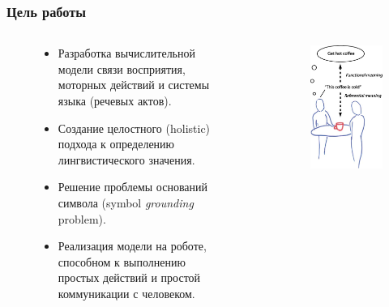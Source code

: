 \documentclass[default]{beamer}
\begin{document}
	\begin{frame}
		\frametitle{Цель работы}
		
		\begin{columns}
			\begin{column}{0.7\textwidth}
				\begin{figure}
					\begin{itemize}
						\item Разработка вычислительной модели связи восприятия, моторных действий и системы языка (речевых актов).
						\item Создание целостного (holistic) подхода к определению лингвистического значения.
						\item Решение проблемы оснований символа (symbol \textit{grounding} problem).
						\item Реализация модели на роботе, способном к выполнению простых действий и простой коммуникации с человеком.
					\end{itemize}
				\end{figure}
			\end{column}
			\begin{column}{0.3\textwidth}
				\begin{figure}
					\includegraphics[width=\textwidth]{roy_meaning}

\end{figure}
\end{column}
\end{columns}
\end{frame}
\end{document}
